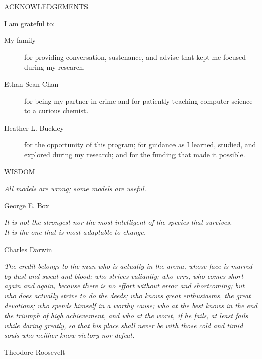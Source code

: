 \newpage
{}

\begin{center}
    ACKNOWLEDGEMENTS
\end{center}

\noindent I am grateful to:
\begin{description}
    \item[My family]
    	for providing conversation, sustenance, and advise that kept me focused during my research.
    \item[Ethan Sean Chan]
    	for being my partner in crime and for patiently teaching computer science to a curious chemist.
    \item[Heather L. Buckley]
    	for the opportunity of this program; for guidance as I learned, studied, and explored during my research; and for the funding that made it possible.
\end{description}

\vspace{5mm}
\begin{center}
    WISDOM 
\end{center}

\vspace{3mm}
\begin{flushright} 
    \textit{All models are wrong; some models are useful.} \\
    \begin{flushright}
        George E. Box
    \end{flushright}
\end{flushright}

\vspace{3mm}
    \begin{flushright}
        \textit{
            It is not the strongest nor the most intelligent of the species that survives. \\
            It is the one that is most adaptable to change.
        } \\
    \begin{flushright}
        Charles Darwin
    \end{flushright}
\end{flushright}

\vspace{3mm}
\begin{justify}
    \textit{
        The credit belongs to the man who is actually in the arena, whose face is marred by dust and sweat and blood; who strives valiantly; who errs, who comes short again and again, because there is no effort without error and shortcoming; but who does actually strive to do the deeds; who knows great enthusiasms, the great devotions; who spends himself in a worthy cause; who at the best knows in the end the triumph of high achievement, and who at the worst, if he fails, at least fails while daring greatly, so that his place shall never be with those cold and timid souls who neither know victory nor defeat.
    } \\
    \begin{flushright}
        Theodore Roosevelt
    \end{flushright}
\end{justify}